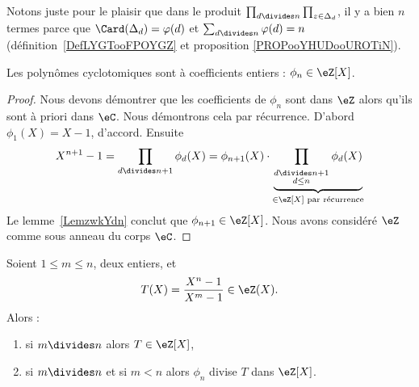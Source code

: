 \begin{remark}
	Notons juste pour le plaisir que dans le produit \( \prod_{d\divides n}\prod_{z\in\Delta_d}\), il y a bien \( n\) termes parce que \( \Card(\Delta_d)=\varphi(d)\) et \( \sum_{d\divides n}\varphi(d)=n\) (définition~\ref{DefLYGTooFPOYGZ} et proposition \ref{PROPooYHUDooUROTiN}).
\end{remark}

\begin{proposition}
	Les polynômes cyclotomiques sont à coefficients entiers : \( \phi_n\in \eZ[X]\).
\end{proposition}

\begin{proof}
	Nous devons démontrer que les coefficients de \( \phi_n\) sont dans \( \eZ\) alors qu'ils sont à priori dans \( \eC\). Nous démontrons cela par récurrence. D'abord \( \phi_1(X)=X-1\), d'accord. Ensuite
	\begin{equation}
		X^{n+1}-1=\prod_{d\divides n+1}\phi_d(X)=\phi_{n+1}(X)\cdot\underbrace{\prod_{_{\substack{d\divides n+1\\d\leq n}}}\phi_d(X)}_{\in\eZ[X]\text{ par récurrence}}
	\end{equation}
	Le lemme~\ref{LemzwkYdn} conclut que \( \phi_{n+1}\in \eZ[X]\). Nous avons considéré \( \eZ\) comme sous anneau du corps \( \eC\).
\end{proof}

\begin{proposition}     \label{PropUImYnL}
	Soient \( 1\leq m\leq n\), deux entiers, et
	\begin{equation}
		T(X)=\frac{ X^n-1 }{ X^m-1 }\in \eZ(X).
	\end{equation}
	Alors :
	\begin{enumerate}
		\item   \label{ItemhpDPKE}
		      si \( m\divides n\) alors \( T\in \eZ[X]\),
		\item
		      si \( m\divides n\) et si \( m<n\) alors \( \phi_n\) divise \( T\) dans \( \eZ[X]\).
	\end{enumerate}
\end{proposition}


